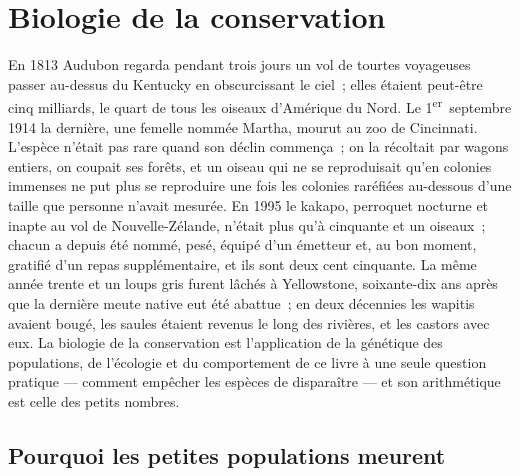 \chapter{Biologie de la conservation}\label{ch:b3:conservation-biology}

En 1813 Audubon regarda pendant trois jours un vol de tourtes voyageuses
passer au-dessus du Kentucky en obscurcissant le ciel~; elles étaient
peut-être cinq milliards, le quart de tous les oiseaux d'Amérique du
Nord. Le 1\textsuperscript{er}~septembre 1914 la dernière, une femelle
nommée Martha, mourut au zoo de Cincinnati. L'espèce n'était pas rare
quand son déclin commença~; on la récoltait par wagons entiers, on
coupait ses forêts, et un oiseau qui ne se reproduisait qu'en colonies
immenses ne put plus se reproduire une fois les colonies raréfiées
au-dessous d'une taille que personne n'avait mesurée. En 1995 le
kakapo, perroquet nocturne et inapte au vol de Nouvelle-Zélande, n'était
plus qu'à cinquante et un oiseaux~; chacun a depuis été nommé, pesé,
équipé d'un émetteur et, au bon moment, gratifié d'un repas
supplémentaire, et ils sont deux cent cinquante. La même année trente et
un loups gris furent lâchés à Yellowstone, soixante-dix ans après que la
dernière meute native eut été abattue~; en deux décennies les wapitis
avaient bougé, les saules étaient revenus le long des rivières, et les
castors avec eux. La biologie de la conservation est l'application de la
génétique des populations, de l'écologie et du comportement de ce livre
à une seule question pratique --- comment empêcher les espèces de
disparaître --- et son arithmétique est celle des petits nombres.

\section{Pourquoi les petites populations meurent}

